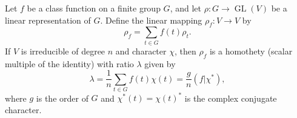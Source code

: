 Let $f$ be a class function on a finite group $G$, and let $\rho: G \to \operatorname{GL}(V)$ be a linear representation of $G$. Define the linear mapping $\rho_f: V \to V$ by
$$\rho_f = \sum_{t \in G} f(t)\rho_t.$$
If $V$ is irreducible of degree $n$ and character $\chi$, then $\rho_f$ is a homothety (scalar multiple of the identity) with ratio $\lambda$ given by
$$\lambda = \frac{1}{n} \sum_{t \in G} f(t)\chi(t) = \frac{g}{n}(f|\chi^*),$$
where $g$ is the order of $G$ and $\chi^*(t) = \chi(t)^*$ is the complex conjugate character.